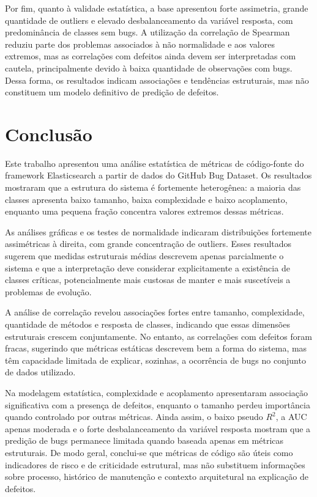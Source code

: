 \documentclass[12pt]{article}
\begin{document}
Por fim, quanto à validade estatística, a base apresentou forte assimetria, grande quantidade de outliers e elevado desbalanceamento da variável resposta, com predominância de classes sem bugs. A utilização da correlação de Spearman reduziu parte dos problemas associados à não normalidade e aos valores extremos, mas as correlações com defeitos ainda devem ser interpretadas com cautela, principalmente devido à baixa quantidade de observações com bugs. Dessa forma, os resultados indicam associações e tendências estruturais, mas não constituem um modelo definitivo de predição de defeitos.

\section{Conclusão}

Este trabalho apresentou uma análise estatística de métricas de código-fonte do framework Elasticsearch a partir de dados do GitHub Bug Dataset. Os resultados mostraram que a estrutura do sistema é fortemente heterogênea: a maioria das classes apresenta baixo tamanho, baixa complexidade e baixo acoplamento, enquanto uma pequena fração concentra valores extremos dessas métricas.

As análises gráficas e os testes de normalidade indicaram distribuições fortemente assimétricas à direita, com grande concentração de outliers. Esses resultados sugerem que medidas estruturais médias descrevem apenas parcialmente o sistema e que a interpretação deve considerar explicitamente a existência de classes críticas, potencialmente mais custosas de manter e mais suscetíveis a problemas de evolução.

A análise de correlação revelou associações fortes entre tamanho, complexidade, quantidade de métodos e resposta de classes, indicando que essas dimensões estruturais crescem conjuntamente. No entanto, as correlações com defeitos foram fracas, sugerindo que métricas estáticas descrevem bem a forma do sistema, mas têm capacidade limitada de explicar, sozinhas, a ocorrência de bugs no conjunto de dados utilizado.

Na modelagem estatística, complexidade e acoplamento apresentaram associação significativa com a presença de defeitos, enquanto o tamanho perdeu importância quando controlado por outras métricas. Ainda assim, o baixo pseudo $R^2$, a AUC apenas moderada e o forte desbalanceamento da variável resposta mostram que a predição de bugs permanece limitada quando baseada apenas em métricas estruturais. De modo geral, conclui-se que métricas de código são úteis como indicadores de risco e de criticidade estrutural, mas não substituem informações sobre processo, histórico de manutenção e contexto arquitetural na explicação de defeitos.
\end{document}
